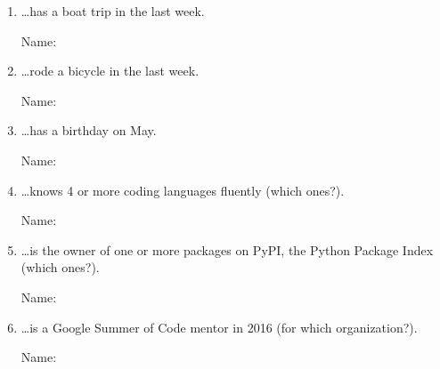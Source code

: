 \documentclass[12pt]{article}
\begin{document}
\begin{enumerate}
  \item \ldots has a boat trip in the last week.

    Name: \hrulefill

  \item \ldots rode a bicycle in the last week.

    Name: \hrulefill

  \item \ldots has a birthday on May.

    Name: \hrulefill

  \item \ldots knows 4 or more coding languages fluently (which ones?).

    Name: \hrulefill

  \item \ldots is the owner of one or more packages on PyPI, the Python Package Index (which ones?).

    Name: \hrulefill

  \item \ldots is a Google Summer of Code mentor in 2016 (for which
    organization?).

    Name: \hrulefill


\end{enumerate}
\end{document}
